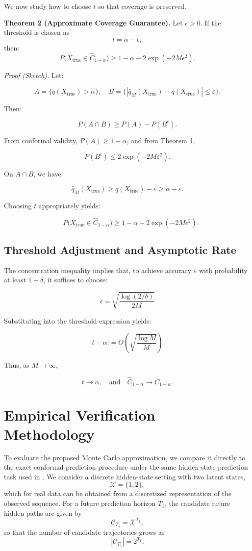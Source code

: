 \documentclass{article}
\begin{document}
We now study how to choose $t$ so that coverage is preserved.

\textbf{Theorem 2 (Approximate Coverage Guarantee).} Let $\epsilon > 0$. If the threshold is chosen as
\[
t = \alpha - \epsilon,
\]
then:
\[
P\big(X_{\text{true}} \in \hat{C}_{1-\alpha}\big)
\ge 1 - \alpha - 2\exp(-2M\epsilon^2).
\]

\textit{Proof (Sketch).}
Let:

\[
A = \{q(X_{\mathrm{true}}) > \alpha \}, \quad
B = \{|\hat{q}_M(X_{\mathrm{true}}) - q(X_{\mathrm{true}})| \le \varepsilon\}.
\]

Then:

\[
P(A \cap B) \ge P(A) - P(B^c).
\]

From conformal validity, $P(A) \ge 1 - \alpha$, and from Theorem 1,

\[
P(B^c) \le 2\exp(-2M\varepsilon^2).
\]

On $A \cap B$, we have:

\[
\hat{q}_M(X_{\mathrm{true}})
\ge
q(X_{\mathrm{true}}) - \varepsilon
\ge
\alpha - \varepsilon.
\]

Choosing $t$ appropriately yields:

\[
\quad
P\big(X_{\text{true}} \in \hat{C}_{1-\alpha}\big)
\ge 1 - \alpha - 2\exp(-2M\epsilon^2).
\]

\subsection{Threshold Adjustment and Asymptotic Rate}

The concentration inequality implies that, to achieve accuracy $\varepsilon$ with probability at least $1 - \delta$, it suffices to choose:

\[
\epsilon = \sqrt{\frac{\log(2/\delta)}{2M}}
\]

Substituting into the threshold expression yields:

\[
|t - \alpha| = O\left(\sqrt{\frac{\log M}{M}}\right).
\]

Thus, as $M \to \infty$,

\[
t \to \alpha,
\quad \text{and} \quad
\hat{C}_{1-\alpha} \to C_{1-\alpha}.
\]

\section{Empirical Verification Methodology}

To evaluate the proposed Monte Carlo approximation, we compare it directly to the exact conformal prediction procedure under the same hidden-state prediction task used in \cite{nettasingheExtendingConformalPrediction2023}. We consider a discrete hidden-state setting with two latent states,
\[
\mathcal{X} = \{1,2\},
\]
which for real data can be obtained from a discretized representation of the observed sequence. For a future prediction horizon $T_1$, the candidate future hidden paths are given by
\[
\mathcal{C}_{T_1} = \mathcal{X}^{T_1},
\]
so that the number of candidate trajectories grows as
\[
|\mathcal{C}_{T_1}| = 2^{T_1}.
\]
\end{document}
